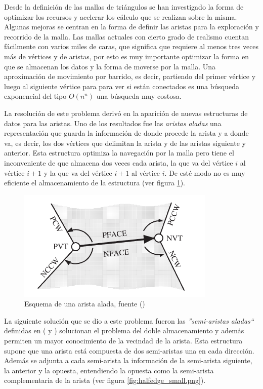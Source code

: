 Desde la definición de las mallas de triángulos se han investigado la forma de optimizar los recursos y acelerar los cálculo que se realizan sobre la misma. Algunas mejoras se centran en la forma de definir las aristas para la exploración y recorrido de la malla. Las mallas actuales con cierto grado de realismo cuentan fácilmente con varios miles de caras, que significa que requiere al menos tres veces más de vértices y de aristas, por esto es muy importante optimizar la forma en que se almacenan los datos y la forma de moverse por la malla. Una aproximación de movimiento por barrido, es decir, partiendo del primer vértice y luego al siguiente vértice para para ver si están conectados es una búsqueda exponencial del tipo $O(n^n)$ una búsqueda muy costosa.

La resolución de este problema derivó en la aparición de nuevas estructuras de datos para las aristas. Uno de los resultados fue las \textit{aristas aladas} una representación que guarda la información de donde procede la arista y a donde va, es decir, los dos vértices que delimitan la arista y de las aristas siguiente y anterior. Esta estructura optimiza la navegación por la malla pero tiene el inconveniente de que almacena dos veces cada arista, la que va del vértice $i$ al vértice $i+1$ y la que va del vértice $i+1$ al vértice $i$. De esté modo no es muy eficiente el almacenamiento de la estructura (ver figura \ref{fig:winger_edge.png}).\\ 


\begin{figure} %
	\centering
	\includegraphics[scale=0.4]{imagenes/winger_edge.png} 
	\caption{Esquema de una arista alada, fuente (\cite{kettnerUsingGenericProgramming1999})} \label{fig:winger_edge.png}
\end{figure}


La siguiente solución que se dio a este problema fueron las \textit{''semi-aristas aladas``} definidas en (\cite{kettnerUsingGenericProgramming1999} y \cite{campagnaDirectedEdgesScalable1998} ) solucionan el problema del doble almacenamiento y además permiten un mayor conocimiento de la vecindad de la arista. Esta estructura supone que una arista está compuesta de dos semi-aristas una en cada dirección. Además se adjunta a cada semi-arista la información de la semi-arista siguiente, la anterior y la opuesta, entendiendo la opuesta como la semi-arista complementaria de la arista (ver figura \ref{fig:halfedge_small.png}). 

